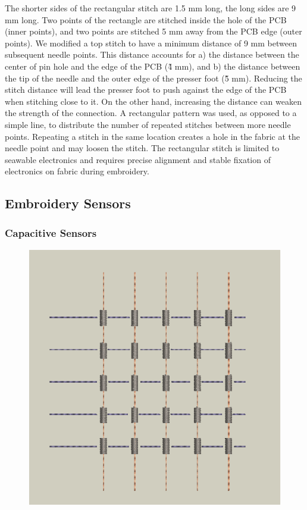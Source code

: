 The shorter sides of the rectangular stitch are 1.5 mm long, the long sides are 9 mm long. Two points of the rectangle are stitched inside the hole of the PCB (inner points), and two points are stitched 5 mm away from the PCB edge (outer points).  We modified a top stitch to have a minimum distance of 9 mm between subsequent needle points. This distance accounts for a) the distance between the center of pin hole and the edge of the PCB (\~ 4 mm), and b) the distance between the tip of the needle and the outer edge of the presser foot (\~5 mm). Reducing the stitch distance will lead the presser foot to push against the edge of the PCB when stitching close to it. On the other hand, increasing the distance can weaken the strength of the connection. A rectangular pattern was used, as opposed to a simple line, to distribute the number of repeated stitches between more needle points. Repeating a stitch in the same location creates a hole in the fabric at the needle point and may loosen the stitch. The rectangular stitch is limited to seawable electronics and requires precise alignment and stable fixation of electronics on fabric during embroidery.




\subsection{Embroidery Sensors}
\subsubsection{Capacitive Sensors} 
\begin{figure}
\centering
  \includegraphics[width=0.9\columnwidth]{figures/MatrixCapacitor}
  \caption{}~\label{fig:MatrixCapacitor}
  \vspace{-2.5em}
\end{figure}

